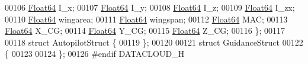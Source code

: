 \begin{DoxyCode}
00106     \hyperlink{group___tools_ga3f1431cb9f76da10f59246d1d743dc2c}{Float64}  I\_x;
00107     \hyperlink{group___tools_ga3f1431cb9f76da10f59246d1d743dc2c}{Float64}   I\_y;
00108     \hyperlink{group___tools_ga3f1431cb9f76da10f59246d1d743dc2c}{Float64}  I\_z;
00109     \hyperlink{group___tools_ga3f1431cb9f76da10f59246d1d743dc2c}{Float64}  I\_zx;
00110     \hyperlink{group___tools_ga3f1431cb9f76da10f59246d1d743dc2c}{Float64}  wingarea;
00111     \hyperlink{group___tools_ga3f1431cb9f76da10f59246d1d743dc2c}{Float64}  wingspan;
00112     \hyperlink{group___tools_ga3f1431cb9f76da10f59246d1d743dc2c}{Float64}  MAC;
00113     \hyperlink{group___tools_ga3f1431cb9f76da10f59246d1d743dc2c}{Float64}  X\_CG;
00114     \hyperlink{group___tools_ga3f1431cb9f76da10f59246d1d743dc2c}{Float64}  Y\_CG;
00115     \hyperlink{group___tools_ga3f1431cb9f76da10f59246d1d743dc2c}{Float64}  Z\_CG;
00116 \};
00117 
00118 \textcolor{keyword}{struct }AutopilotStruct \{
00119 \};
00120 
00121 \textcolor{keyword}{struct }GuidanceStruct
00122 \{
00123 
00124 \};
00126 \textcolor{preprocessor}{#endif  DATACLOUD\_H}
\end{DoxyCode}
